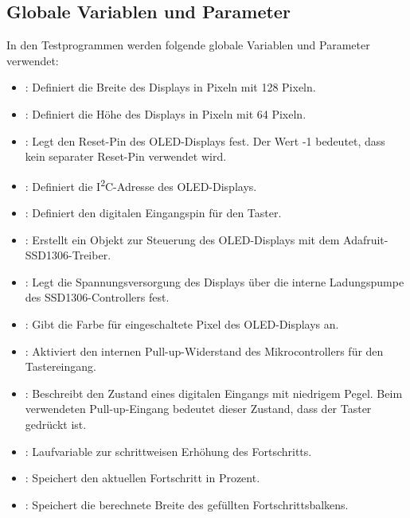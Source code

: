 \subsection{Globale Variablen und Parameter}

In den Testprogrammen werden folgende globale Variablen und Parameter verwendet:

\begin{itemize}
	\item {}: Definiert die Breite des Displays in Pixeln mit 128 Pixeln.
	
	\item {}: Definiert die Höhe des Displays in Pixeln mit 64 Pixeln.
	
	\item {}: Legt den Reset-Pin des OLED-Displays fest. Der Wert -1 bedeutet, dass kein separater Reset-Pin verwendet wird.
	
	\item {}: Definiert die I\textsuperscript{2}C-Adresse des OLED-Displays.
	
	\item {}: Definiert den digitalen Eingangspin für den Taster.
	
	\item {}: Erstellt ein Objekt zur Steuerung des OLED-Displays mit dem Adafruit-SSD1306-Treiber.
	
	\item {}: Legt die Spannungsversorgung des Displays über die interne Ladungspumpe des SSD1306-Controllers fest.
	
	\item {}: Gibt die Farbe für eingeschaltete Pixel des OLED-Displays an.
	
	\item {}: Aktiviert den internen Pull-up-Widerstand des Mikrocontrollers für den Tastereingang.
	
	\item {}: Beschreibt den Zustand eines digitalen Eingangs mit niedrigem Pegel. Beim verwendeten Pull-up-Eingang bedeutet dieser Zustand, dass der Taster gedrückt ist.
	
	\item {}: Laufvariable zur schrittweisen Erhöhung des Fortschritts.
	
	\item {}: Speichert den aktuellen Fortschritt in Prozent.
	
	\item {}: Speichert die berechnete Breite des gefüllten Fortschrittsbalkens.
\end{itemize}


